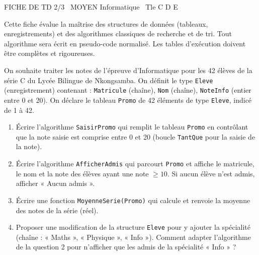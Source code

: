 \documentclass[11pt]{article}
\begin{document}
\begin{tcolorbox}[enhanced,colback=popink,colframe=popink,arc=10pt,boxrule=0pt,left=12pt,right=12pt,top=9pt,bottom=9pt]
{\color{white}\popxbold\small FICHE DE TD 2/3 \textbullet\ MOYEN \hfill Informatique \textbullet\ Tle C D E\par}
\end{tcolorbox}
\vspace{4pt}
\noindent Cette fiche évalue la maîtrise des structures de données (tableaux, enregistrements) et des algorithmes classiques de recherche et de tri. Tout algorithme sera écrit en pseudo-code normalisé. Les tables d'exécution doivent être complètes et rigoureuses.

\begin{exercice}
On souhaite traiter les notes de l'épreuve d'Informatique pour les \num{42} élèves de la série C du Lycée Bilingue de Nkongsamba. On définit le type \texttt{Eleve} (enregistrement) contenant : \texttt{Matricule} (chaîne), \texttt{Nom} (chaîne), \texttt{NoteInfo} (entier entre 0 et 20). On déclare le tableau \texttt{Promo} de \num{42} éléments de type \texttt{Eleve}, indicé de 1 à 42.

\begin{enumerate}
    \item Écrire l'algorithme \texttt{SaisirPromo} qui remplit le tableau \texttt{Promo} en contrôlant que la note saisie est comprise entre 0 et 20 (boucle \texttt{TantQue} pour la saisie de la note).
    \item Écrire l'algorithme \texttt{AfficherAdmis} qui parcourt \texttt{Promo} et affiche le matricule, le nom et la note des élèves ayant une note $\ge 10$. Si aucun élève n'est admis, afficher « Aucun admis ».
    \item Écrire une fonction \texttt{MoyenneSerie(Promo)} qui calcule et renvoie la moyenne des notes de la série (réel).
    \item Proposer une modification de la structure \texttt{Eleve} pour y ajouter la spécialité (chaîne : « Maths », « Physique », « Info »). Comment adapter l'algorithme de la question 2 pour n'afficher que les admis de la spécialité « Info » ?
\end{enumerate}
\end{exercice}
\end{document}
